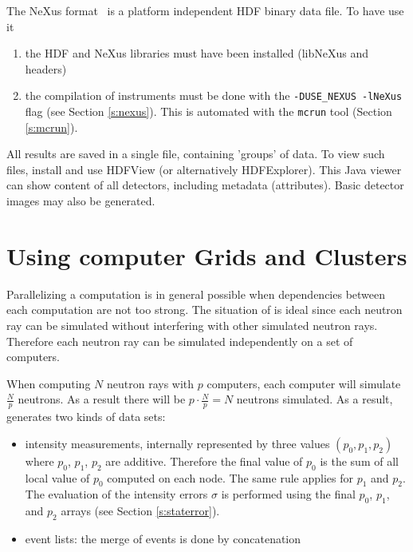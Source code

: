 The NeXus format~\cite{nexus_webpage} is a platform independent HDF binary data
file. To have \MCS use it
\begin{enumerate}
\item the HDF and NeXus libraries must have been installed (libNeXus and headers)
\item the compilation of instruments must be done with the
  \verb+-DUSE_NEXUS -lNeXus+ flag (see Section \ref{s:nexus}). This is
  automated with the \verb+mcrun+ tool (Section \ref{s:mcrun}).
\end{enumerate}
All results are saved in a single file, containing 'groups' of data. To view
such files, install and use HDFView (or alternatively HDFExplorer). This Java
viewer can show content of all detectors, including metadata (attributes). Basic
detector images may also be generated.

\section{Using computer Grids and Clusters}
\label{s:run-mpi}

Parallelizing a computation is in general possible when dependencies between
  each computation are not too strong. The situation of \MCS is
  ideal since each neutron ray can be simulated without interfering with
  other simulated neutron rays. Therefore each neutron ray can be simulated
  independently on a set of computers.

  When computing $N$ neutron rays with $p$ computers, each computer will
  simulate $\frac{N}{p}$ neutrons. As a result there will be $p \cdot
  \frac{N}{p} = N$ neutrons simulated. As a result, \MCS generates two kinds of
  data sets:
\begin{itemize}
\item intensity measurements, internally represented by three
  values $(p_0, p_1, p_2)$ where $p_0$, $p_1$, $p_2$ are
  additive. Therefore the final value of $p_0$ is the sum of all
  local value of  $p_0$ computed on each node. The same rule applies
  for $p_1$ and $p_2$. The evaluation of the intensity errors $\sigma$
  is performed using the final $p_0$, $p_1$, and $p_2$ arrays (see Section \ref{s:staterror}).
\item event lists: the merge of events is done by concatenation
\end{itemize}

